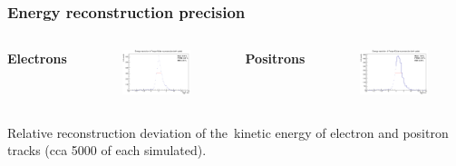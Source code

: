 \documentclass{beamer}
\begin{document}
	\begin{frame}
		\frametitle{Energy reconstruction precision}
		\centering
		\begin{columns}
			\centering
			\Large \textbf{Electrons}
			\begin{figure}
				\centering
				\includegraphics[width = 0.95 \linewidth]{../images/c_e_delta_energy.png}
			\end{figure}
			\centering
			\Large \textbf{Positrons}
			\begin{figure}
				\centering
				\includegraphics[width = 0.95 \linewidth]{../images/c_p_delta_energy.png}
			\end{figure}
		\end{columns}
		\vspace{0.5cm}
		\footnotesize{Relative reconstruction deviation of the~kinetic energy of electron and positron tracks (cca 5000 of each simulated).}
	\end{frame}
\end{document}
